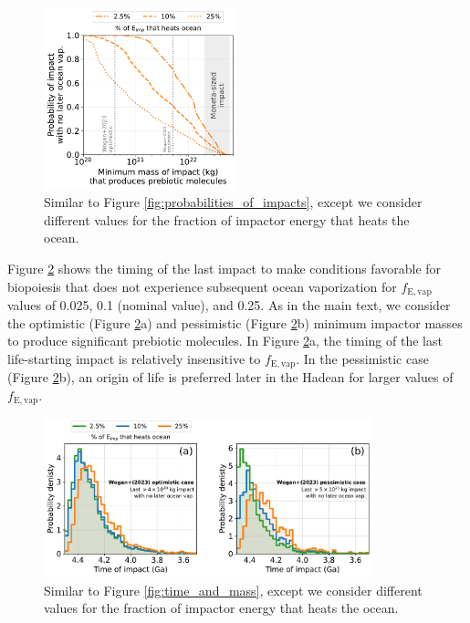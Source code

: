\documentclass[manuscript]{aastex63}
\begin{document}
\begin{figure}
  \centering
  \includegraphics[width=0.5\textwidth]{figures/probabilities_of_impacts_sens.pdf}
  \caption{Similar to Figure \ref{fig:probabilities_of_impacts}, except we consider different values for the fraction of impactor energy that heats the ocean.}
  \label{fig:probabilities_of_impacts_sens}
\end{figure}

Figure \ref{fig:timing_sensitivity} shows the timing of the last impact to make conditions favorable for biopoiesis that does not experience subsequent ocean vaporization for $f_\mathrm{E,vap}$ values of 0.025, 0.1 (nominal value), and 0.25. As in the main text, we consider the \citet{Wogan_2023} optimistic (Figure \ref{fig:timing_sensitivity}a) and pessimistic (Figure \ref{fig:timing_sensitivity}b) minimum impactor masses to produce significant prebiotic molecules. In Figure \ref{fig:timing_sensitivity}a, the timing of the last life-starting impact is relatively insensitive to $f_\mathrm{E,vap}$. In the \citet{Wogan_2023} pessimistic case (Figure \ref{fig:timing_sensitivity}b), an origin of life is preferred later in the Hadean for larger values of $f_\mathrm{E,vap}$.

\begin{figure}
  \centering
  \includegraphics[width=0.85\textwidth]{figures/timing_sensitivity.pdf}
  \caption{Similar to Figure \ref{fig:time_and_mass}, except we consider different values for the fraction of impactor energy that heats the ocean.}
  \label{fig:timing_sensitivity}
\end{figure}
\end{document}
